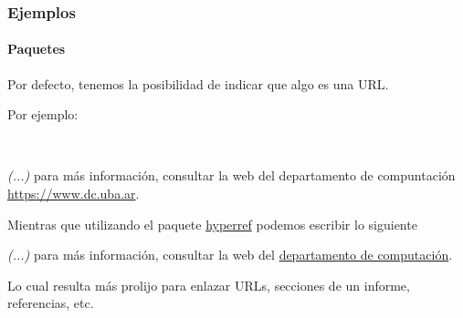 \begin{frame}
\frametitle{Ejemplos}
\framesubtitle{Paquetes}

Por defecto, tenemos la posibilidad de indicar que algo es una URL. 

Por ejemplo:

\

\begin{center}
\textit{(...)} para más información, consultar la web del departamento de compuntación \url{https://www.dc.uba.ar}.
\end{center}

\pause

Mientras que utilizando el paquete \href{https://ctan.org/pkg/hyperref}{hyperref} podemos escribir lo siguiente


\begin{center}
\textit{(...)} para más información, consultar la web del \href{https://www.dc.uba.ar}{departamento de computación}.
\end{center}

Lo cual resulta más prolijo para enlazar URLs, secciones de un informe, referencias, etc.

\end{frame}
